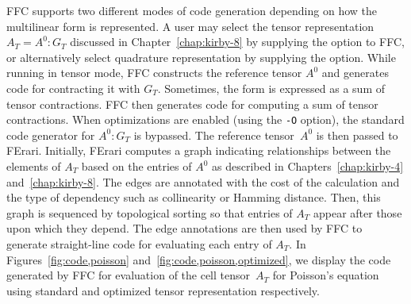 FFC supports two different modes of code generation depending on how
the multilinear form is represented. A user may select the tensor
representation $A_T = A^0 : G_T$ discussed in
Chapter~\ref{chap:kirby-8} by supplying the  option to
FFC, or alternatively select quadrature representation by supplying
the  option.  While running in tensor mode, FFC
constructs the reference tensor $A^0$ and generates code for
contracting it with $G_T$. Sometimes, the form is expressed as a sum
of tensor contractions. FFC then generates code for computing a sum of
tensor contractions.  When optimizations are enabled (using the
\texttt{-O} option), the standard code generator for $A^0 : G_T$ is
bypassed. The reference tensor~$A^0$ is then passed to
FErari. Initially, FErari computes a graph indicating relationships
between the elements of $A_T$ based on the entries of $A^0$ as
described in Chapters~\ref{chap:kirby-4} and~\ref{chap:kirby-8}. The
edges are annotated with the cost of the calculation and the type of
dependency such as collinearity or Hamming distance. Then, this graph
is sequenced by topological sorting so that entries of $A_T$ appear
after those upon which they depend. The edge annotations are then used
by FFC to generate straight-line code for evaluating each entry of
$A_T$. In Figures~\ref{fig:code,poisson}
and~\ref{fig:code,poisson,optimized}, we display the code generated by
FFC for evaluation of the cell tensor~$A_T$ for Poisson's equation
using standard and optimized tensor representation respectively.

